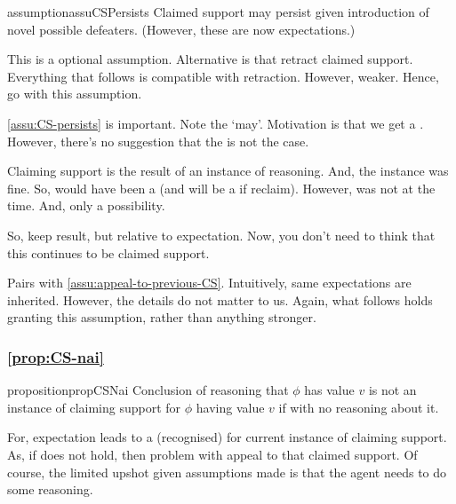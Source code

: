 \begin{note}
  \begin{restatable}{assumption}{assuCSPersists}\label{assu:CS-persists}
    Claimed support may persist given introduction of novel possible defeaters.
    (However, these are now expectations.)
  \end{restatable}

  This is a optional assumption.
  Alternative is that retract claimed support.
  Everything that follows is compatible with retraction.
  However, weaker.
  Hence, go with this assumption.
\end{note}

\begin{note}
  \autoref{assu:CS-persists} is important.
  Note the `may'.
  Motivation is that we get a \requ{}.
  However, there's no suggestion that the \requ{} is not the case.

  Claiming support is the result of an instance of reasoning.
  And, the instance was fine.
  So, would have been a \requ{} (and will be a \requ{} if reclaim).
  However, was not at the time.
  And, only a possibility.

  So, keep result, but relative to expectation.
  Now, you don't need to think that this continues to be claimed support.

  Pairs with \autoref{assu:appeal-to-previous-CS}.
  Intuitively, same expectations are inherited.
  However, the details do not matter to us.
  Again, what follows holds granting this assumption, rather than anything stronger.
\end{note}

\subsubsection{\autoref{prop:CS-nai}}
\label{sec:claim-supp-nai}

\begin{note}
  \begin{restatable}{proposition}{propCSNai}\label{prop:CS-nai}
    Conclusion of reasoning that \(\phi\) has value \(v\) is not an instance of claiming support for \(\phi\) having value \(v\) if \expec{} with no reasoning about it.
  \end{restatable}

  For, expectation leads to a (recognised) \requ{} for current instance of claiming support.
  As, if \expec{} does not hold, then problem with appeal to that claimed support.
  Of course, the limited upshot given assumptions made is that the agent needs to do some reasoning.
\end{note}

